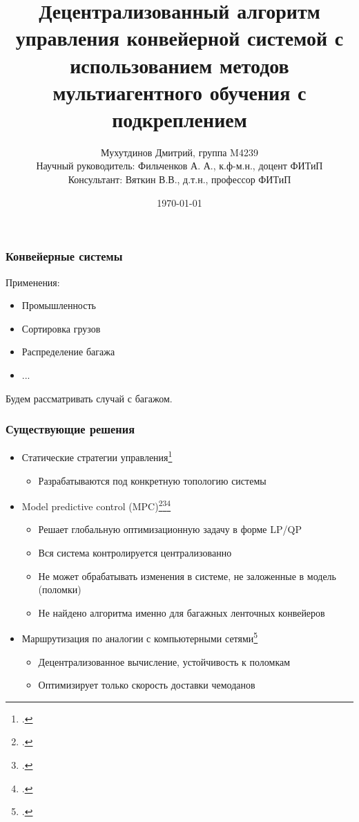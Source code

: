 \documentclass{beamer}
\title[DQN-LE-routing]{
  Децентрализованный алгоритм управления конвейерной системой
  с использованием методов мультиагентного обучения с подкреплением
}
\author[Дмитрий Мухутдинов, М4239]{
  Мухутдинов Дмитрий, группа M4239 \\
  Научный руководитель: Фильченков А. А., к.ф-м.н., доцент ФИТиП \\
  Консультант: Вяткин В.В., д.т.н., профессор ФИТиП
}%
\institute[ИТМО] %
{
  Факультет Информационных Технологий и Программирования \\
  Мегафакультет Трансляционных Информационных Технологий \\
  Университет ИТМО, Санкт-Петербург
}
\date{\today} %
\begin{document}
\frame{\titlepage}


\begin{frame}
  \frametitle{Конвейерные системы}
  Применения:
  \begin{itemize}
  \item Промышленность
  \item Сортировка грузов
  \item Распределение багажа
  \item ...
  \end{itemize}
  Будем рассматривать случай с багажом.
\end{frame}


\begin{frame}
  \frametitle{Существующие решения}
  \begin{itemize}
  \item Статические стратегии управления\footcite{de1994baggage}
    \begin{itemize}
    \item Разрабатываются под конкретную топологию системы
    \end{itemize}
  \item Model predictive control (MPC)\footcite{cataldo2016dynamic}\footcite{zeinaly2015integrated}\footcite{luo2015energy}
    \begin{itemize}
    \item Решает глобальную оптимизационную задачу в форме LP/QP
    \item Вся система контролируется централизованно
    \item Не может обрабатывать изменения в системе, не заложенные в модель (поломки)
    \item Не найдено алгоритма именно для багажных ленточных конвейеров
    \end{itemize}
  \item Маршрутизация по аналогии с компьютерными сетями\footcite{vyatkin-controllers}
    \begin{itemize}
    \item Децентрализованное вычисление, устойчивость к поломкам
    \item Оптимизирует только скорость доставки чемоданов
    \end{itemize}
  \end{itemize}
\end{frame}
\end{document}
